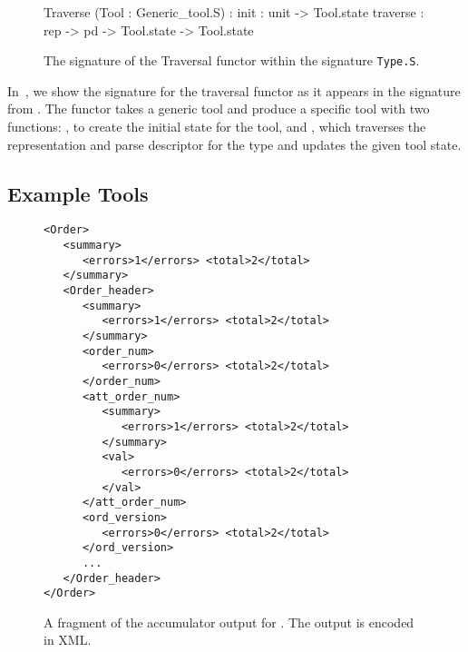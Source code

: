 \begin{figure}
\begin{code}\scriptsize
   Traverse (Tool : Generic_tool.S) :
     init : unit -> Tool.state
     traverse : rep -> pd -> Tool.state -> Tool.state
\end{code}
\caption{The signature of the Traversal functor within the signature \texttt{Type.S}.}
\label{fig:traversal-interface}
\end{figure}

In~, we show the signature for the
traversal functor as it appears in the signature  from
. The functor takes a generic tool and produce
a specific tool with two functions: , to create the initial
state for the tool, and , which traverses the
representation and parse descriptor for the type and updates the given
tool state.

\subsection{Example Tools}
\label{sec:gentool-motivation-ex}


\begin{figure}
  \centering
  \scriptsize
\begin{verbatim}
<Order>
   <summary>
      <errors>1</errors> <total>2</total>        
   </summary>
   <Order_header>
      <summary>
         <errors>1</errors> <total>2</total>        
      </summary>
      <order_num>
         <errors>0</errors> <total>2</total>        
      </order_num>
      <att_order_num>
         <summary>
            <errors>1</errors> <total>2</total>        
         </summary>
         <val>
            <errors>0</errors> <total>2</total>                
         </val>
      </att_order_num>
      <ord_version>
         <errors>0</errors> <total>2</total>                
      </ord_version>
      ...
   </Order_header>
</Order>
\end{verbatim}  
  \caption{A fragment of the accumulator output for \dibbler{}. The
    output is encoded in XML.}
  \label{fig:gentool-acc-output}
\end{figure}

